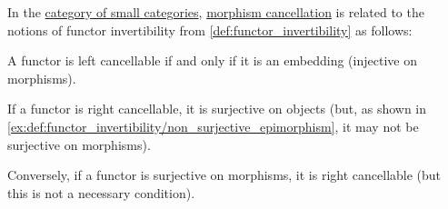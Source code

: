 \begin{proposition}\label{thm:small_functor_cancellation}
  In the \hyperref[def:category_of_small_categories]{category of small categories}, \hyperref[def:morphism_cancellation]{morphism cancellation} is related to the notions of functor invertibility from \cref{def:functor_invertibility} as follows:
  \begin{thmenum}
     A functor is left cancellable if and only if it is an embedding (injective on morphisms).

     If a functor is right cancellable, it is surjective on objects (but, as shown in \cref{ex:def:functor_invertibility/non_surjective_epimorphism}, it may not be surjective on morphisms).

    Conversely, if a functor is surjective on morphisms, it is right cancellable (but this is not a necessary condition).
  \end{thmenum}
\end{proposition}

